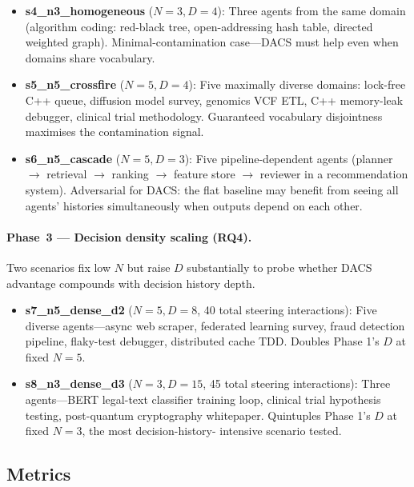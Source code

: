 \documentclass{article}
\begin{document}
\begin{itemize}
  \item \textbf{s4\_n3\_homogeneous} ($N=3, D=4$): Three agents from the
  same domain (algorithm coding: red-black tree, open-addressing hash
  table, directed weighted graph).
  Minimal-contamination case—DACS must help even when domains share
  vocabulary.

  \item \textbf{s5\_n5\_crossfire} ($N=5, D=4$): Five maximally diverse
  domains: lock-free C++ queue, diffusion model survey, genomics VCF
  ETL, C++ memory-leak debugger, clinical trial methodology.
  Guaranteed vocabulary disjointness maximises the contamination signal.

  \item \textbf{s6\_n5\_cascade} ($N=5, D=3$): Five pipeline-dependent
  agents (planner $\to$ retrieval $\to$ ranking $\to$ feature store $\to$
  reviewer in a recommendation system).
  Adversarial for DACS: the flat baseline may benefit from seeing all
  agents' histories simultaneously when outputs depend on each other.
\end{itemize}

\paragraph{Phase~3 — Decision density scaling (RQ4).}
Two scenarios fix low $N$ but raise $D$ substantially to probe whether
DACS advantage compounds with decision history depth.

\begin{itemize}
  \item \textbf{s7\_n5\_dense\_d2} ($N=5, D=8$, 40 total steering
  interactions): Five diverse agents—async web scraper, federated
  learning survey, fraud detection pipeline, flaky-test debugger,
  distributed cache TDD.
  Doubles Phase 1's $D$ at fixed $N=5$.

  \item \textbf{s8\_n3\_dense\_d3} ($N=3, D=15$, 45 total steering
  interactions): Three agents—BERT legal-text classifier training loop,
  clinical trial hypothesis testing, post-quantum cryptography
  whitepaper.
  Quintuples Phase 1's $D$ at fixed $N=3$, the most decision-history-
  intensive scenario tested.
\end{itemize}

\subsection{Metrics}
\label{sec:metrics}
\end{document}
